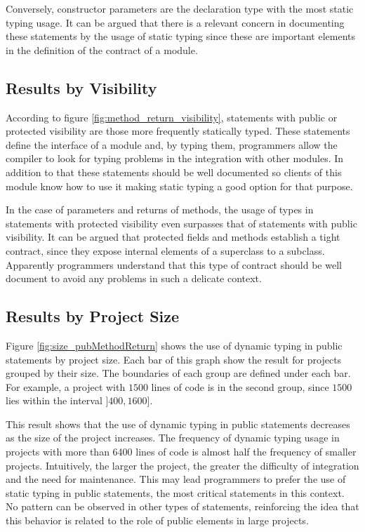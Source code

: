 \documentclass[preprint]{sigplanconf}
\begin{document}
Conversely, constructor parameters are the declaration type with the most static typing usage.
It can be argued that there is a relevant concern in documenting these statements by the usage of static typing since these are important elements in the definition of the contract of a module.

\subsection{Results by Visibility\label{sub:visibility-results}}
According to figure \ref{fig:method_return_visibility}, statements with public or protected visibility are those more frequently statically typed. 
These statements define the interface of a module and, by typing them, programmers allow the compiler to look for typing problems in the integration with other modules.
In addition to that these statements should be well documented so clients of this module know how to use it making static typing a good option for that purpose.

In the case of parameters and returns of methods, the usage of types in statements with protected visibility even surpasses that of statements with public visibility.
It can be argued that protected fields and methods establish a tight contract, since they expose internal elements of a superclass to a subclass.
Apparently programmers understand that this type of contract should be well document to avoid any problems in such a delicate context.

\subsection{Results by Project Size\label{sub:size-results}}
Figure \ref{fig:size_pubMethodReturn} shows the use of dynamic typing in public statements by project size. 
Each bar of this graph show the result for projects grouped by their size.
The boundaries of each group are defined under each bar.
For example, a project with $1500$ lines of code is in the second group, since $1500$ lies within the interval $]400, 1600]$.

This result shows that the use of dynamic typing in public statements decreases as the size of the project
increases. 
The frequency of dynamic typing usage in projects with more than 6400 lines of code is almost half the frequency of smaller projects.
Intuitively, the larger the project, the greater the difficulty of integration and the need for maintenance.
This may lead programmers to prefer the use of static typing in public statements, the most critical  statements in this context.
No pattern can be observed in other types of statements, reinforcing the idea that this behavior is related to the role of public elements in large projects.
\end{document}
